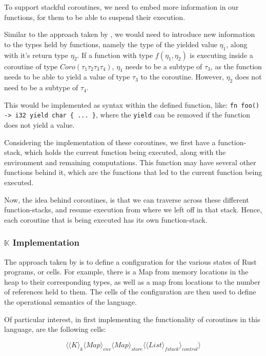 \documentclass[review,twocolumn,preprint]{sigplanconf}
\begin{document}
To support stackful coroutines, we need to embed more information in our functions, for them to be able to suspend their execution.

Similar to the approach taken by \cite{konrad2011}, we would need to introduce new information to the types held by functions, namely the type of the yielded value $\eta_1$, along with it's return type $\eta_2$. If a function with type $f(\eta_1, \eta_2)$ is executing inside a coroutine of type $Coro({\tau_1}{\tau_2}{\tau_3}{\tau_4})$, $\eta_1$ needs to be a subtype of $\tau_3$, as the function needs to be able to yield a value of type $\tau_3$ to the coroutine. However, $\eta_2$ does not need to be a subtype of $\tau_4$.

This would be implemented as syntax within the defined function, like:
\verb!fn foo() -> i32 yield char { ... }!, where the \verb!yield! can be removed if the function does not yield a value.

Considering the implementation of these coroutines, we first have a function-stack, which holds the current function being executed, along with the environment and remaining computations. This function may have several other functions behind it, which are the functions that led to the current function being executed.

Now, the idea behind coroutines, is that we can traverse across these different function-stacks, and resume execution from where we left off in that stack. Hence, each coroutine that is being executed has its own function-stack.

\subsubsection{$\mathbb{K}$ Implementation}

The approach taken by \citet{Krust2018} is to define a configuration for the various states of Rust programs, or cells. For example, there is a Map from memory locations in the heap to their corresponding types, as well as a map from locations to the number of references held to them. The cells of the configuration are then used to define the operational semantics of the language.

Of particular interest, in first implementing the functionality of coroutines in this language, are the following cells:

\[
  \Biggl \langle
  \langle K \rangle_k
  \langle Map \rangle_{env}
  \langle Map \rangle_{store}
  \langle \langle List \rangle_{fstack} \rangle_{control}
  \Biggr \rangle
\]
\end{document}
